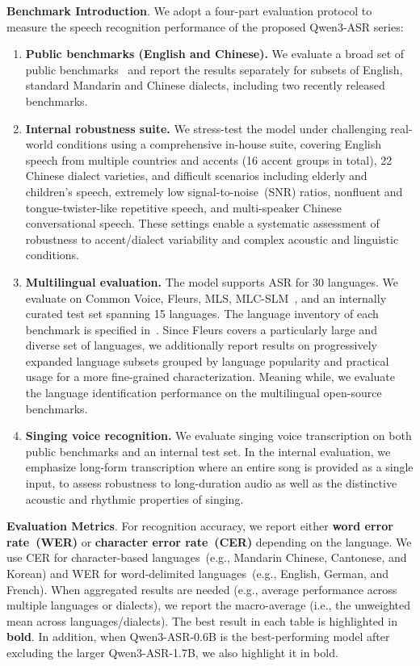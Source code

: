 \textbf{Benchmark Introduction}. We adopt a four-part evaluation protocol to measure the speech recognition performance of the proposed Qwen3-ASR series:
\begin{enumerate}[leftmargin=*,itemsep=0.25em]
  \item \textbf{Public benchmarks (English and Chinese).} We evaluate a broad set of public benchmarks~\citep{conneau2023fleurs, ardila2020common, zhang2022wenetspeech, panayotov2015librispeech,  dai2025wenetspeech, li2025wenetspeech} and report the results separately for subsets of English, standard Mandarin and Chinese dialects, including two recently released benchmarks.
  \item \textbf{Internal robustness suite.} We stress-test the model under challenging real-world conditions using a comprehensive in-house suite, covering English speech from multiple countries and accents (16 accent groups in total), 22 Chinese dialect varieties, and difficult scenarios including elderly and children's speech, extremely low signal-to-noise~(SNR) ratios, nonfluent and tongue-twister-like repetitive speech, and multi-speaker Chinese conversational speech. These settings enable a systematic assessment of robustness to accent/dialect variability and complex acoustic and linguistic conditions.
  \item \textbf{Multilingual evaluation.} The model supports ASR for 30 languages. We evaluate on Common Voice, Fleurs, MLS, MLC-SLM~\citep{mlcslm}, and an internally curated test set spanning 15 languages. The language inventory of each benchmark is specified in~. Since Fleurs covers a particularly large and diverse set of languages, we additionally report results on progressively expanded language subsets grouped by language popularity and practical usage for a more fine-grained characterization. Meaning while, we evaluate the language identification performance on the multilingual open-source benchmarks. 
  \item \textbf{Singing voice recognition.} We evaluate singing voice transcription on both public benchmarks and an internal test set. In the internal evaluation, we emphasize long-form transcription where an entire song is provided as a single input, to assess robustness to long-duration audio as well as the distinctive acoustic and rhythmic properties of singing.
\end{enumerate}

\textbf{Evaluation Metrics}. For recognition accuracy, we report either \textbf{word error rate~(WER)} or \textbf{character error rate~(CER)} depending on the language. We use CER for character-based languages~(e.g., Mandarin Chinese, Cantonese, and Korean) and WER for word-delimited languages~(e.g., English, German, and French). When aggregated results are needed (e.g., average performance across multiple languages or dialects), we report the macro-average (i.e., the unweighted mean across languages/dialects). The best result in each table is highlighted in \textbf{bold}. In addition, when Qwen3-ASR-0.6B is the best-performing model after excluding the larger Qwen3-ASR-1.7B, we also highlight it in bold.

